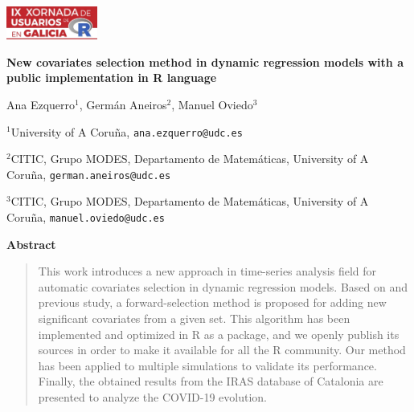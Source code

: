 \documentclass[twoside]{article}
\begin{document}
\begin{flushright}
\includegraphics[angle=0,keepaspectratio,width=3cm]{logo.pdf}
\end{flushright}

 \vspace{20pt}

\begin{center}
\textbf{New covariates selection method in dynamic regression models with a public implementation in R language}

\vspace{0.15cm}

Ana Ezquerro$^{1}$, Germán Aneiros$^{2}$, Manuel Oviedo$^{3}$
\end{center}

\vspace{0.06cm}

$^{1}$University of A Coruña, \texttt{ana.ezquerro@udc.es}

$^{2}$CITIC, Grupo MODES, Departamento de Matemáticas, University of A Coruña, \texttt{german.aneiros@udc.es}


$^{3}$CITIC, Grupo MODES, Departamento de Matemáticas, University of A Coruña, \texttt{manuel.oviedo@udc.es}


\begin{center}
\textbf{Abstract}
\end{center}


\begin{quotation}
    This work introduces a new approach in time-series analysis field for automatic covariates selection in dynamic regression models. Based on \cite{cryer2008time} and \cite{hyndman2018forecasting} previous study, a forward-selection method is proposed for adding new significant covariates from a given set. This algorithm has been implemented and optimized in R as a package, and we openly publish its sources in order to make it available for all the R community. Our method has been applied to multiple simulations to validate its performance. Finally, the obtained results from the IRAS database of Catalonia are presented to analyze the COVID-19 evolution. 
\end{quotation}
\end{document}
